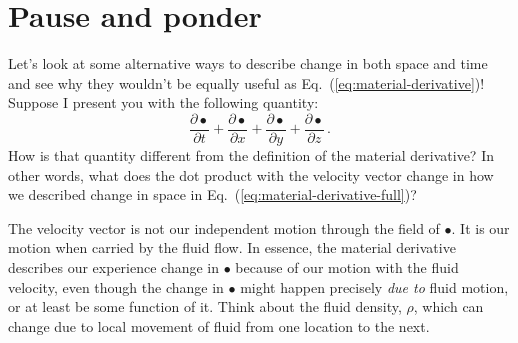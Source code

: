 \section{Pause and ponder}

Let's look at some alternative ways to describe change in both space and time and see why they wouldn't be equally useful as Eq.~(\ref{eq:material-derivative})! Suppose I present you with the following quantity:
\begin{equation} \label{eq:all-derivatives}
\frac{\partial \bullet}{\partial t} + \frac{\partial \bullet}{\partial x} + \frac{\partial \bullet}{\partial y} + \frac{\partial \bullet}{\partial z} \, .
\end{equation}
How is that quantity different from the definition of the material derivative? In other words, what does the dot product with the velocity vector change in how we described change in space in Eq.~(\ref{eq:material-derivative-full})?



The velocity vector is not our independent motion through the field of $\bullet$. It is our motion when carried by the fluid flow. In essence, the material derivative describes our experience change in $\bullet$ because of our motion with the fluid velocity, even though the change in $\bullet$ might happen precisely \textit{due to} fluid motion, or at least be some function of it. Think about the fluid density, $\rho$, which can change due to local movement of fluid from one location to the next.


